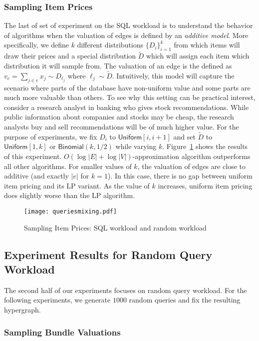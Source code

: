 \subsubsection{Sampling Item Prices} The last of set of experiment on the SQL workload is to understand the behavior of algorithms when the valuation of edges is defined by an \emph{additive model}. More specifically, we define $k$ different distributions $\{D_i\}_{i=1}^{k}$ from which items will draw their prices and a special distribution $\tilde{D}$ which will assign each item which distribution it will sample from. The valuation of an edge is the defined as $v_e = \sum_{j \in e} x_j \sim D_{\ell_j}$ where $\ell_j \sim \tilde{D}$. Intuitively, this model will capture the scenario where parts of the database have non-uniform value and some parts are much more valuable than others. To see why this setting can be practical interest, consider a research analyst in banking who gives stock recommendations. While public information about companies and stocks may be cheap, the research analysts buy and sell recommendations will be of much higher value. For the purpose of experiments, we fix $D_i$ to $\textsf{Uniform}[i, i+1]$ and set $\tilde{D}$ to $\textsf{Uniform}[1, k]$ or $\textsf{Binomial}(k, 1/2)$ while varying $k$. Figure~\ref{fig:mixing} shows the results of this experiment. $O(\log |E| + \log |V|)$-approximation algorithm outperforms all other algorithms. For smaller values of $k$, the valuation of edges are close to additive (and exactly $|e|$ for $k=1$). In this case, there is no gap between uniform item pricing and its LP variant. As  the value of $k$ increases, uniform item pricing does slightly worse than the LP algorithm.


\begin{figure}[!t]
	\centering
	\texttt{[image: queriesmixing.pdf]}
	\caption{Sampling Item Prices: SQL workload and random workload} \label{fig:mixing}
\end{figure}  

\subsection{Experiment Results for Random Query Workload}


The second half of our experiments focuses on random query workload. For the following experiments, we generate $1000$ random queries and fix the resulting hypergraph. 

\subsubsection{Sampling Bundle Valuations}

